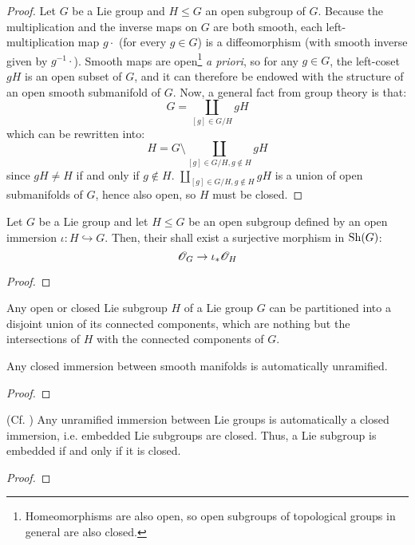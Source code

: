             \begin{proof}
                Let $G$ be a Lie group and $H \leq G$ an open subgroup of $G$. Because the multiplication and the inverse maps on $G$ are both smooth, each left-multiplication map $g \cdot$ (for every $g \in G$) is a diffeomorphism (with smooth inverse given by $g^{-1} \cdot$). Smooth maps are open\footnote{Homeomorphisms are also open, so open subgroups of topological groups in general are also closed.} \textit{a priori}, so for any $g \in G$, the left-coset $gH$ is an open subset of $G$, and it can therefore be endowed with the structure of an open smooth submanifold of $G$. Now, a general fact from group theory is that:
                    $$G = \coprod_{[g] \in G/H} gH$$
                which can be rewritten into:
                    $$H = G \setminus \coprod_{[g] \in G/H, g \not \in H} gH$$
                since $gH \not = H$ if and only if $g \not \in H$. $\coprod_{[g] \in G/H, g \not \in H} gH$ is a union of open submanifolds of $G$, hence also open, so $H$ must be closed.
            \end{proof}
        \begin{corollary} \label{coro: smooth_functions_on_open_lie_subgroups}
            Let $G$ be a Lie group and let $H \leq G$ be an open subgroup defined by an open immersion $\iota: H \hookrightarrow G$. Then, their shall exist a surjective morphism in $\mathrm{Sh}(G)$:
                $$\mathscr{O}_G \to \iota_* \mathscr{O}_H$$
        \end{corollary}
            \begin{proof}
                
            \end{proof}
        \begin{corollary}
            Any open or closed Lie subgroup $H$ of a Lie group $G$ can be partitioned into a disjoint union of its connected components, which are nothing but the intersections of $H$ with the connected components of $G$.
        \end{corollary}
        \begin{lemma} \label{lemma: closed_immersions_are_unramified}
            Any closed immersion between smooth manifolds is automatically unramified.
        \end{lemma}
            \begin{proof}
                
            \end{proof}
        \begin{proposition} \label{prop: embedded_lie_subgroups_are_closed}
            (Cf. \cite[Theorem 7.21]{lee_smooth_manifolds}) Any unramified immersion between Lie groups is automatically a closed immersion, i.e. embedded Lie subgroups are closed. Thus, a Lie subgroup is embedded if and only if it is closed.
        \end{proposition}
            \begin{proof}
                
            \end{proof}

